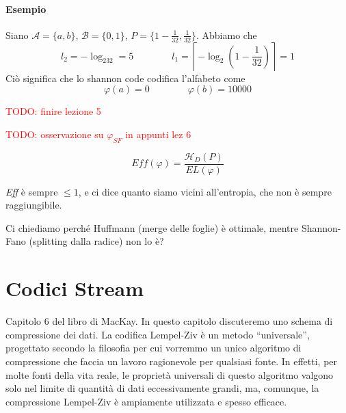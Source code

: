 \paragraph{Esempio} Siano $\mathcal{A}=\{a,b\}$, $\mathcal{B}=\{0,1\}$, $P=\{1-\frac{1}{32},\frac{1}{32}\}$. Abbiamo che
$$
    l_2 = -\log_232 = 5 \qquad\qquad l_1 = \left\lceil -\log_2\left(1-\frac{1}{32}\right)\right\rceil = 1
$$
Ciò significa che lo shannon code codifica l'alfabeto come
$$
    \varphi(a) = 0 \qquad\qquad \varphi(b) = 10000
$$
\begin{center}
\end{center}



\textcolor{Red}{TODO: finire lezione 5}

\textcolor{Red}{TODO: osservazione su $\varphi_{SF}$ in appunti lez 6}


\begin{definition}
    $$
        Eff(\varphi) = \frac{\mathcal{H}_D(P)}{EL(\varphi)}
    $$
\end{definition}
\emph{Eff} è sempre $\leq 1$, e ci dice quanto siamo vicini all'entropia, che non è sempre raggiungibile.\medskip

Ci chiediamo perché Huffmann (merge delle foglie) è ottimale, mentre Shannon-Fano (splitting dalla radice) non lo è?


\section{Codici Stream}
Capitolo 6 del libro di MacKay. In questo capitolo discuteremo uno schema di compressione dei dati. La codifica Lempel-Ziv è un metodo ``universale'', progettato secondo la filosofia per cui vorremmo un unico algoritmo di compressione che faccia un lavoro ragionevole per qualsiasi fonte. In effetti, per molte fonti della vita reale, le proprietà universali di questo algoritmo valgono solo nel limite di quantità di dati eccessivamente grandi, ma, comunque, la compressione Lempel-Ziv è ampiamente utilizzata e spesso efficace.


